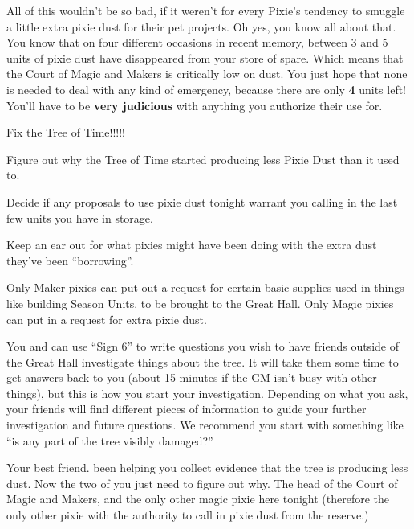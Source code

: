 \documentclass[char]{PP}
\begin{document}
All of this wouldn’t be so bad, if it weren’t for every Pixie’s tendency to smuggle a little extra pixie dust for their pet projects. Oh yes, you know all about that. You know that on four different occasions in recent memory, between 3 and 5 units of pixie dust have disappeared from your store of spare. Which means that the Court of Magic and Makers is critically low on dust. You just hope that none is needed to deal with any kind of emergency, because there are only \textbf{4} units left! You’ll have to be \textbf{very judicious} with anything you authorize their use for.

\begin{itemz}
	\item Fix the Tree of Time!!!!!
	\item Figure out why the Tree of Time started producing less Pixie Dust than it used to.
	\item Decide if any proposals to use pixie dust tonight warrant you calling in the last few units you have in storage.
	\item Keep an ear out for what pixies might have been doing with the extra dust they’ve been “borrowing”.
\end{itemz}

\begin{itemz}[Notes]
	\item Only Maker pixies can put out a request for certain basic supplies used in things like building Season Units. to be brought to the Great Hall. Only Magic pixies can put in a request for extra pixie dust.
	\item You and \cSHelp{} can use ``Sign 6'' to write questions you wish to have friends outside of the Great Hall investigate things about the tree. It will take them some time to get answers back to you (about 15 minutes if the GM isn't busy with other things), but this is how you start your investigation. Depending on what you ask, your friends will find different pieces of information to guide your further investigation and future questions. We recommend you start with something like ``is any part of the tree visibly damaged?''
\end{itemz}

\begin{contacts}
	\contact{\cSHelp{}} Your best friend. \cSHelp{\They} \cSHelp{\have} been helping you collect evidence that the tree is producing less dust. Now the two of you just need to figure out why.
	\contact{\cMHead{}} The head of the Court of Magic and Makers, and the only other magic pixie here tonight (therefore the only other pixie with the authority to call in pixie dust from the reserve.)
\end{contacts}
\end{document}
